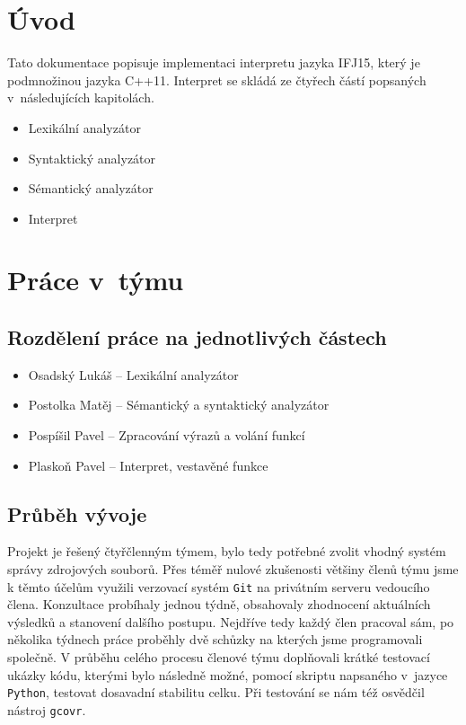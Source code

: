 \documentclass[a4paper, 12pt]{article}
\begin{document}
\tableofcontents
\newpage
\section{Úvod} \label{uvod}

Tato dokumentace popisuje implementaci interpretu jazyka IFJ15, který je
podmnožinou jazyka C++11. Interpret se skládá ze čtyřech částí
popsaných v~následujících kapitolách.

\begin{itemize}
	\item Lexikální analyzátor
	\item Syntaktický analyzátor
	\item Sémantický analyzátor
	\item Interpret
\end{itemize}
\section{Práce v~týmu} \label{team}

\subsection{Rozdělení práce na jednotlivých částech}
\begin{itemize}
	\item Osadský Lukáš -- Lexikální analyzátor
	\item Postolka Matěj -- Sémantický a syntaktický analyzátor
	\item Pospíšil Pavel -- Zpracování výrazů a volání funkcí
	\item Plaskoň Pavel -- Interpret, vestavěné funkce
\end{itemize}

\subsection{Průběh vývoje}
Projekt je řešený čtyřčlenným týmem, bylo tedy potřebné zvolit vhodný systém
správy zdrojových souborů. Přes téměř nulové zkušenosti většiny členů týmu jsme
k těmto účelům využili verzovací systém \texttt{Git} na privátním serveru
vedoucího člena.
Konzultace probíhaly jednou týdně, obsahovaly zhodnocení aktuálních výsledků
a stanovení dalšího postupu. Nejdříve tedy každý člen pracoval sám, po několika
týdnech práce proběhly dvě schůzky na kterých jsme programovali společně.
V průběhu celého procesu členové týmu doplňovali krátké testovací ukázky kódu,
kterými bylo následně možné, pomocí skriptu napsaného v~jazyce \texttt{Python},
testovat dosavadní stabilitu celku. Při testování se nám též osvědčil nástroj
\texttt{gcovr}.
\end{document}
